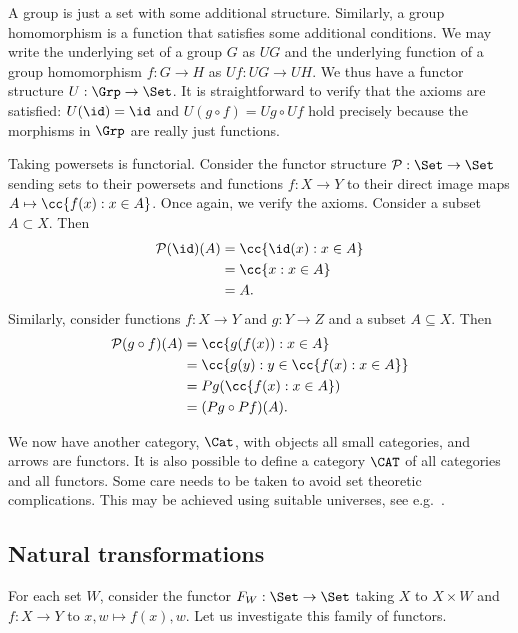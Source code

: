 \documentclass{article}
\begin{document}
\begin{example}
  A group is just a set with some additional structure. Similarly,
  a group homomorphism is a function that satisfies some
  additional conditions. We may write the underlying set of a group $G$
  as $UG$ and the underlying function of a group homomorphism $f:G\to H$
  as $Uf:UG\to UH$. We thus have a functor structure $U:\Grp\to\Set$.
  It is straightforward to verify that the axioms are satisfied:
  $U(\id) = \id$ and $U(g\circ f) = Ug\circ Uf$ hold precisely because
  the morphisms in $\Grp$ are really just functions.
\end{example}

\begin{example}
  Taking powersets is functorial. Consider the functor structure $\mathcal
  P:\Set\to\Set$ sending sets to their powersets and functions $f:X\to Y$ to
  their direct image maps $A\mapsto \cc{f(x) : x\in A}$. Once again, we
  verify the axioms. Consider a subset $A\subset X$. Then
  \begin{align*}
    \mathcal P(\id)(A) &= \cc{\id(x) : x \in A} \\
                       &= \cc{x : x \in A} \\
                       &= A.
  \end{align*}
  Similarly, consider functions $f:X\to Y$ and $g:Y\to Z$ and a subset
  $A\subseteq X$. Then
  \begin{align*}
    \mathcal P(g\circ f)(A) &= \cc{ g(f(x)) : x\in A} \\
                            &= \cc{g(y) : y \in \cc{f(x) : x \in A}}\\
                            &= Pg(\cc{f(x) : x \in A}) \\
                            &= (Pg\circ Pf)(A).
  \end{align*}
\end{example}

We now have another category, $\Cat$, with objects all small categories, and
arrows are functors. It is also possible to define a category $\CAT$ of
all categories and all functors. Some care needs to be taken to avoid
set theoretic complications. This may be achieved using suitable universes,
see e.g.~\cite{maclane1997}.

\subsection{Natural transformations}

For each set $W$, consider the functor $F_W:\Set\to\Set$ taking $X$ to $X\times W$
and $f:X\to Y$ to $x,w\mapsto f(x),w$. Let us investigate this family of
functors.
\end{document}
